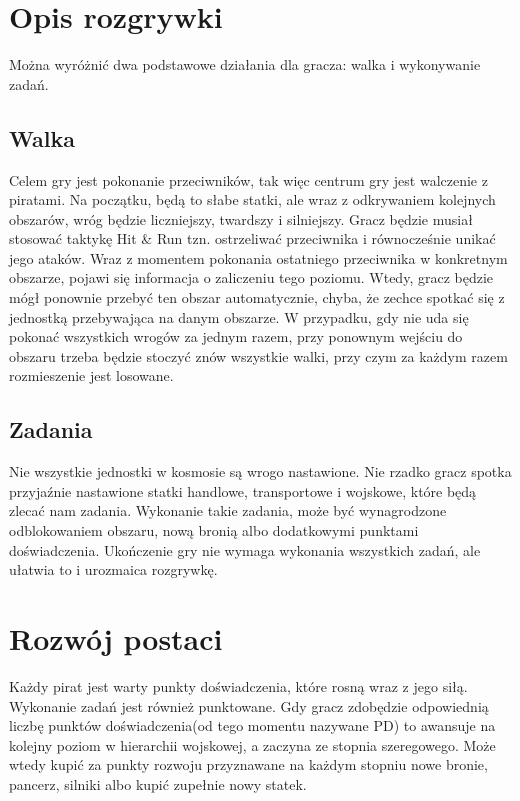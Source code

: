 \section{Opis rozgrywki}
Można wyróżnić dwa podstawowe działania dla gracza: walka i wykonywanie zadań.

\subsection{Walka}
Celem gry jest pokonanie przeciwników, tak więc centrum gry jest walczenie z piratami. Na początku, będą to słabe statki, ale wraz z odkrywaniem kolejnych obszarów, wróg będzie liczniejszy, twardszy i silniejszy. Gracz będzie musiał stosować taktykę Hit \& Run tzn. ostrzeliwać przeciwnika i równocześnie unikać jego ataków. Wraz z momentem pokonania ostatniego przeciwnika w konkretnym obszarze, pojawi się informacja o zaliczeniu tego poziomu. Wtedy, gracz będzie mógł ponownie przebyć ten obszar automatycznie, chyba, że zechce spotkać się z jednostką przebywająca na danym obszarze. W przypadku, gdy nie uda się pokonać wszystkich wrogów za jednym razem, przy ponownym wejściu do obszaru trzeba będzie stoczyć znów wszystkie walki, przy czym za każdym razem rozmieszenie jest losowane.

\subsection{Zadania}
Nie wszystkie jednostki w kosmosie są wrogo nastawione. Nie rzadko gracz spotka przyjaźnie nastawione statki handlowe, transportowe i wojskowe, które będą zlecać nam zadania. Wykonanie takie zadania, może być wynagrodzone odblokowaniem obszaru, nową bronią albo dodatkowymi punktami doświadczenia. Ukończenie gry nie wymaga wykonania wszystkich zadań, ale ułatwia to i urozmaica rozgrywkę.

\section{Rozwój postaci}
Każdy pirat jest warty punkty doświadczenia, które rosną wraz z jego siłą. Wykonanie zadań jest również punktowane. Gdy gracz zdobędzie odpowiednią liczbę punktów doświadczenia(od tego momentu nazywane PD) to awansuje na kolejny poziom w hierarchii wojskowej, a zaczyna ze stopnia szeregowego. Może wtedy kupić za punkty rozwoju przyznawane na każdym stopniu nowe bronie, pancerz, silniki albo kupić zupełnie nowy statek.
